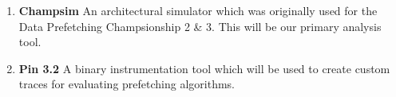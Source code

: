 
\begin{enumerate}
	\item \textbf{Champsim} An architectural simulator which was originally used for the Data Prefetching
	Champsionship 2 \& 3. This will be our primary analysis tool.
	\item \textbf{Pin 3.2} A binary instrumentation tool which will be used to create custom traces for
	evaluating prefetching algorithms.
\end{enumerate}